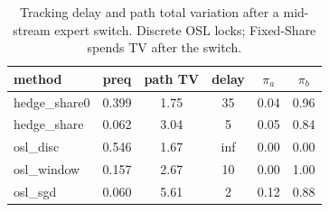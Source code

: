 \begin{table}[t]\centering
\caption{Tracking delay and path total variation after a mid-stream expert switch. Discrete OSL locks; Fixed-Share spends TV after the switch.}
\label{tab:agod-stack-track}
\begin{tabular}{lccccc}\toprule
method & preq & path TV & delay & $\pi_a$ & $\pi_b$ \\
\midrule
hedge\_share0 & 0.399 & 1.75 & 35 & 0.04 & 0.96 \\
hedge\_share & 0.062 & 3.04 & 5 & 0.05 & 0.84 \\
osl\_disc & 0.546 & 1.67 & inf & 0.00 & 0.00 \\
osl\_window & 0.157 & 2.67 & 10 & 0.00 & 1.00 \\
osl\_sgd & 0.060 & 5.61 & 2 & 0.12 & 0.88 \\
\bottomrule
\end{tabular}
\end{table}
